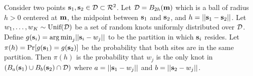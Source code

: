 Consider two points $\mbox{\bf s}_1, \mbox{\bf s}_2 \in {\cal D} \subset {\cal R}^2$. Let ${\cal D} = B_{2h}(\mbox{\bf m})$ which is a ball of radius $h > 0$ centered at $\mbox{\bf m}$, the midpoint between $\mbox{\bf s}_1$ and $\mbox{\bf s}_2$, and $h = ||\mbox{\bf s}_1 - \mbox{\bf s}_2||$. Let $w_1, \ldots, w_K \sim \text{Unif}({\cal D})$ be a set of random knots uniformly distributed over ${\cal D}$. Define $g(\mbox{\bf s}_i) = {\mathop{\rm arg\, min}}_j || \mbox{\bf s}_i - w_j ||$ to be the partition in which $\mbox{\bf s}_i$ resides. Let $\pi(h) = \Pr[ g(\mbox{\bf s}_1) = g(\mbox{\bf s}_2)]$ be the probability that both sites are in the same partition. Then $\pi(h)$ is the probability that $w_j$ is the only knot in $(B_a(\mbox{\bf s}_1) \cup B_b(\mbox{\bf s}_2) \cap {\cal D})$ where $a = ||\mbox{\bf s}_1 - w_j||$ and $b = ||\mbox{\bf s}_2 - w_j||$.